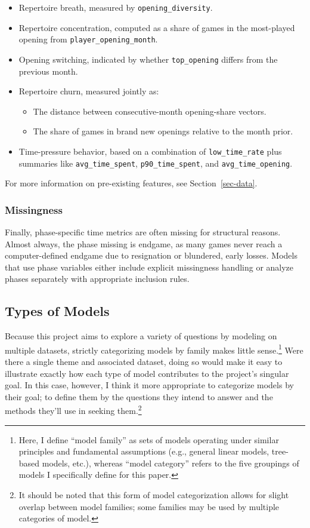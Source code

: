 \documentclass[
  12pt]{article}
\providecommand{\tightlist}{%
  \setlength{\itemsep}{0pt}\setlength{\parskip}{0pt}}\usepackage{longtable,booktabs,array}
\begin{document}
\begin{itemize}
\tightlist
\item
  Repertoire breath, measured by \texttt{opening\_diversity}.
\item
  Repertoire concentration, computed as a share of games in the
  most-played opening from \texttt{player\_opening\_month}.
\item
  Opening switching, indicated by whether \texttt{top\_opening} differs
  from the previous month.
\item
  Repertoire churn, measured jointly as:

  \begin{itemize}
  \tightlist
  \item
    The distance between consecutive-month opening-share vectors.
  \item
    The share of games in brand new openings relative to the month
    prior.
  \end{itemize}
\item
  Time-pressure behavior, based on a combination of
  \texttt{low\_time\_rate} plus summaries like
  \texttt{avg\_time\_spent}, \texttt{p90\_time\_spent}, and
  \texttt{avg\_time\_opening}.
\end{itemize}

For more information on pre-existing features, see
Section~\ref{sec-data}.

\subsubsection{Missingness}\label{missingness}

Finally, phase-specific time metrics are often missing for structural
reasons. Almost always, the phase missing is endgame, as many games
never reach a computer-defined endgame due to resignation or blundered,
early losses. Models that use phase variables either include explicit
missingness handling or analyze phases separately with appropriate
inclusion rules.

\subsection{Types of Models}\label{types-of-models}

Because this project aims to explore a variety of questions by modeling
on multiple datasets, strictly categorizing models by family makes
little sense.\footnote{Here, I define ``model family'' as sets of models
  operating under similar principles and fundamental assumptions (e.g.,
  general linear models, tree-based models, etc.), whereas ``model
  category'' refers to the five groupings of models I specifically
  define for this paper.} Were there a single theme and associated
dataset, doing so would make it easy to illustrate exactly how each type
of model contributes to the project's singular goal. In this case,
however, I think it more appropriate to categorize models by their goal;
to define them by the questions they intend to answer and the methods
they'll use in seeking them.\footnote{It should be noted that this form
  of model categorization allows for slight overlap between model
  families; some families may be used by multiple categories of model.}
\end{document}
